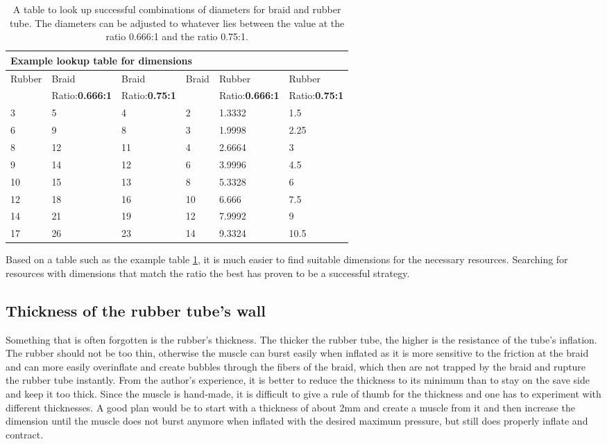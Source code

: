 \documentclass[main]{subfiles}
\begin{document}
\begin{table}
\begin{tabular}{lllp{1cm}lll}
\toprule
\multicolumn{7}{l}{\textbf{Example lookup table for dimensions}} \\
\midrule
Rubber & Braid & \multicolumn{2}{l}{Braid}& Braid & Rubber & Rubber\\
{} & Ratio:\textbf{0.666:1} & \multicolumn{2}{l}{Ratio:\textbf{0.75:1}} & {} & Ratio:\textbf{0.666:1} & Ratio:\textbf{0.75:1}\\
\midrule
3 & 5 & 4 & {} & 2 & 1.3332 & 1.5 \\
6 & 9 & 8 & {} & 3 & 1.9998 & 2.25 \\
8 & 12 & 11 & {} & 4 & 2.6664 & 3 \\
9 & 14 & 12 & {}& 6 & 3.9996 & 4.5 \\
10 & 15 & 13 & {} & 8 & 5.3328 & 6 \\
12 & 18 & 16 & {} & 10 & 6.666 & 7.5 \\
14 & 21 & 19 & {} & 12 & 7.9992 & 9 \\
17 & 26 & 23 & {} & 14 & 9.3324 & 10.5 \\
\end{tabular}
\caption[Diameter ratios]{A table to look up successful combinations of diameters for braid and rubber tube. The diameters can be adjusted to whatever lies between the value at the ratio 0.666:1 and the ratio 0.75:1.}
\label{look-up-table}
\end{table}

Based on a table such as the example table \ref{look-up-table}, it is much easier to find suitable dimensions for the necessary resources. Searching for resources with dimensions that match the ratio the best has proven to be a successful strategy.

\subsection{Thickness of the rubber tube's wall}

Something that is often forgotten is the rubber's thickness. The thicker the rubber tube, the higher is the resistance of the tube's inflation. The rubber should not be too thin, otherwise the muscle can burst easily when inflated as it is more sensitive to the friction at the braid and can more easily overinflate and create bubbles through the fibers of the braid, which then are not trapped by the braid and rupture the rubber tube instantly. From the author's experience, it is better to reduce the thickness to its minimum than to stay on the save side and keep it too thick. Since the muscle is hand-made, it is difficult to give a rule of thumb for the thickness and one has to experiment with different thicknesses. A good plan would be to start with a thickness of about 2mm and create a muscle from it and then increase the dimension until the muscle does not burst anymore when inflated with the desired maximum pressure, but still does properly inflate and contract.
\end{document}
